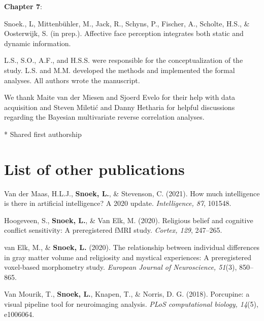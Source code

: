 \documentclass[12pt,american,a4paper,oneside,]{memoir} %
\begin{document}
\textbf{Chapter 7}:

\vspace{2mm}

Snoek., L, Mittenbühler, M., Jack, R., Schyns, P., Fischer, A., Scholte, H.S., \& Oosterwijk, S. (in prep.). Affective face perception integrates both static and dynamic information.

\vspace{2mm}

L.S., S.O., A.F., and H.S.S. were responsible for the conceptualization of the study. L.S. and M.M. developed the methods and implemented the formal analyses. All authors wrote the manuscript.

\vspace{2mm}

We thank Maite van der Miesen and Sjoerd Evelo for their help with data acquisition and Steven Miletić and Danny Hetharia for helpful discussions regarding the Bayesian multivariate reverse correlation analyses.

\vspace{3mm}

* Shared first authorship

\hypertarget{list-of-other-publications}{%
\chapter*{List of other publications}\label{list-of-other-publications}}


Van der Maas, H.L.J., \textbf{Snoek, L.}, \& Stevenson, C. (2021). How much intelligence is there in artificial intelligence? A 2020 update. \emph{Intelligence, 87}, 101548.
\vspace{2mm}

Hoogeveen, S., \textbf{Snoek, L.}, \& Van Elk, M. (2020). Religious belief and cognitive conflict sensitivity: A preregistered fMRI study. \emph{Cortex, 129}, 247--265.
\vspace{2mm}

van Elk, M., \& \textbf{Snoek, L.} (2020). The relationship between individual differences in gray matter volume and religiosity and mystical experiences: A preregistered voxel‐based morphometry study. \emph{European Journal of Neuroscience, 51}(3), 850--865.
\vspace{2mm}

Van Mourik, T., \textbf{Snoek, L.}, Knapen, T., \& Norris, D. G. (2018). Porcupine: a visual pipeline tool for neuroimaging analysis. \emph{PLoS computational biology, 14}(5), e1006064.
\end{document}
